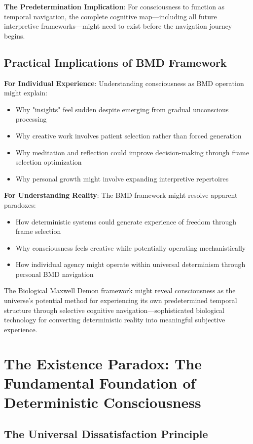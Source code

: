 \documentclass[12pt]{article}
\begin{document}
\textbf{The Predetermination Implication}: For consciousness to function as temporal navigation, the complete cognitive map—including all future interpretive frameworks—might need to exist before the navigation journey begins.

\subsection{Practical Implications of BMD Framework}

\textbf{For Individual Experience}:
Understanding consciousness as BMD operation might explain:
\begin{itemize}
\item Why "insights" feel sudden despite emerging from gradual unconscious processing
\item Why creative work involves patient selection rather than forced generation
\item Why meditation and reflection could improve decision-making through frame selection optimization
\item Why personal growth might involve expanding interpretive repertoires
\end{itemize}

\textbf{For Understanding Reality}:
The BMD framework might resolve apparent paradoxes:
\begin{itemize}
\item How deterministic systems could generate experience of freedom through frame selection
\item Why consciousness feels creative while potentially operating mechanistically
\item How individual agency might operate within universal determinism through personal BMD navigation
\end{itemize}

The Biological Maxwell Demon framework might reveal consciousness as the universe's potential method for experiencing its own predetermined temporal structure through selective cognitive navigation—sophisticated biological technology for converting deterministic reality into meaningful subjective experience.

\section{The Existence Paradox: The Fundamental Foundation of Deterministic Consciousness}

\subsection{The Universal Dissatisfaction Principle}
\end{document}
